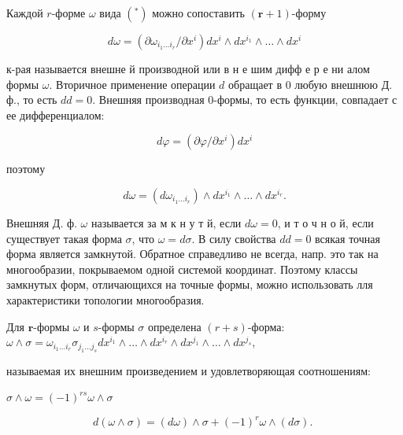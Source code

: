 \documentclass[10pt]{article}
\begin{document}
Каждой $r$-форме $\omega$ вида $\left(^{*}\right)$ можно сопоставить $(\boldsymbol{r}+1)$-форму



\[

d \omega=\left(\partial \omega_{i_{1} \ldots i_{r}} / \partial x^{i}\right) d x^{i} \wedge d x^{i_{1}} \wedge \ldots \wedge d x^{i}

\]



к-рая называется внешне й производной или в н е шим дифф е р е ни алом формы $\omega$. Вторичное применение операции $d$ обращает в 0 любую внешнюю Д. ф., то есть $d d=0$. Внешняя производная 0-формы, то есть функции, совпадает с ее дифференциалом:



\[

d \varphi=\left(\partial \varphi / \partial x^{i}\right) d x^{i}

\]



поэтому



\[

d \omega=\left(d \omega_{i_{1} \ldots i_{r}}\right) \wedge d x^{i_{1}} \wedge \ldots \wedge d x^{i_{r}} .

\]



Внешняя Д. ф. $\omega$ называется за м к н у т й, если $d \omega=0$, и т о ч н о й, если существует такая форма $\sigma$, что $\omega=d \sigma$. В силу свойства $d d=0$ всякая точная форма является замкнутой. Обратное справедливо не всегда, напр. это так на многообразии, покрываемом одной системой координат. Поэтому классы замкнутых форм, отличающихся на точные формы, можно использовать лля характеристики топологии многообразия.



Для $\boldsymbol{r}$-формы $\omega$ и $s$-формы $\sigma$ определена $(r+s)$-форма: $\omega \wedge \sigma=\omega_{i_{1} \ldots i_{r}} \sigma_{j_{1} \ldots j_{s}} d x^{i_{1}} \wedge \ldots \wedge d x^{i_{r}} \wedge d x^{j_{1}} \wedge \ldots \wedge d x^{j_{s}}$,



называемая их внешним произведением и удовлетворяющая соотношениям:



$\sigma \wedge \omega=(-1)^{r s} \omega \wedge \sigma$



\[

d(\omega \wedge \sigma)=(d \omega) \wedge \sigma+(-1)^{r} \omega \wedge(d \sigma) \text {. }

\]
\end{document}
